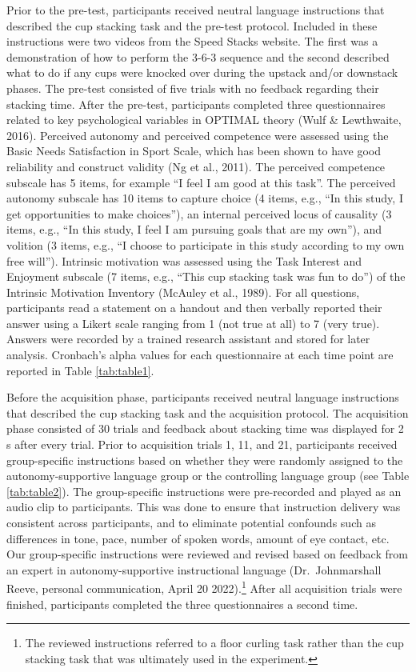 \documentclass[
  man, donotrepeattitle,mask,floatsintext]{apa7}
\begin{document}
Prior to the pre-test, participants received neutral language instructions that described the cup stacking task and the pre-test protocol. Included in these instructions were two videos from the Speed Stacks website. The first was a demonstration of how to perform the 3-6-3 sequence and the second described what to do if any cups were knocked over during the upstack and/or downstack phases. The pre-test consisted of five trials with no feedback regarding their stacking time. After the pre-test, participants completed three questionnaires related to key psychological variables in OPTIMAL theory (Wulf \& Lewthwaite, 2016). Perceived autonomy and perceived competence were assessed using the Basic Needs Satisfaction in Sport Scale, which has been shown to have good reliability and construct validity (Ng et al., 2011). The perceived competence subscale has 5 items, for example ``I feel I am good at this task''. The perceived autonomy subscale has 10 items to capture choice (4 items, e.g., ``In this study, I get opportunities to make choices''), an internal perceived locus of causality (3 items, e.g., ``In this study, I feel I am pursuing goals that are my own''), and volition (3 items, e.g., ``I choose to participate in this study according to my own free will''). Intrinsic motivation was assessed using the Task Interest and Enjoyment subscale (7 items, e.g., ``This cup stacking task was fun to do'') of the Intrinsic Motivation Inventory (McAuley et al., 1989). For all questions, participants read a statement on a handout and then verbally reported their answer using a Likert scale ranging from 1 (not true at all) to 7 (very true). Answers were recorded by a trained research assistant and stored for later analysis. Cronbach's alpha values for each questionnaire at each time point are reported in Table \ref{tab:table1}.

Before the acquisition phase, participants received neutral language instructions that described the cup stacking task and the acquisition protocol. The acquisition phase consisted of 30 trials and feedback about stacking time was displayed for 2 s after every trial. Prior to acquisition trials 1, 11, and 21, participants received group-specific instructions based on whether they were randomly assigned to the autonomy-supportive language group or the controlling language group (see Table \ref{tab:table2}). The group-specific instructions were pre-recorded and played as an audio clip to participants. This was done to ensure that instruction delivery was consistent across participants, and to eliminate potential confounds such as differences in tone, pace, number of spoken words, amount of eye contact, etc. Our group-specific instructions were reviewed and revised based on feedback from an expert in autonomy-supportive instructional language (Dr.~Johnmarshall Reeve, personal communication, April 20 2022).\footnote{The reviewed instructions referred to a floor curling task rather than the cup stacking task that was ultimately used in the experiment.} After all acquisition trials were finished, participants completed the three questionnaires a second time.
\end{document}
